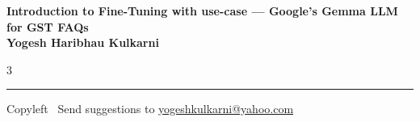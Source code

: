 \documentclass[8pt,landscape]{article}
\begin{document}
\footnotesize


\begin{center}
\Large{\textbf{Introduction to Fine-Tuning with use-case --- Google's Gemma LLM for GST FAQs\\ Yogesh Haribhau Kulkarni}}
\end{center}

\begin{multicols}{3}

\end{multicols}

\rule{\linewidth}{0.25pt}
\scriptsize
Copyleft \textcopyleft\  Send suggestions to
\href{http://www.yogeshkulkarni.com}{yogeshkulkarni@yahoo.com}
\end{document}

